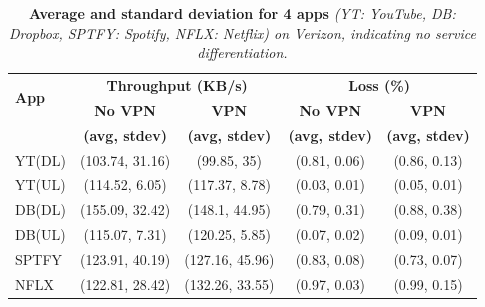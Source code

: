  \begin{table}
\centering
\begin{small}
\begin{tabular}{|p{}|c|c|c|c|}
\hline
\multirow{2}{*}{\bf App} & \multicolumn{2}{c|}{\bf Throughput (KB/s)} &  \multicolumn{2}{c|}{\bf Loss (\%)} \tabularnewline
\cline{2-5}
                              & {\bf No VPN}  & {\bf VPN} & {\bf No VPN} & {\bf VPN}   \tabularnewline
                              & {\bf (avg, stdev)}  & {\bf (avg, stdev)} & {\bf (avg, stdev)} & {\bf (avg, stdev)}   \tabularnewline
\hline

YT(DL) & (103.74, 31.16) & (99.85, 35) & (0.81, 0.06) & (0.86, 0.13) \tabularnewline
\hline
YT(UL) & (114.52, 6.05) & (117.37, 8.78) & (0.03, 0.01) & (0.05, 0.01) \tabularnewline
\hline
DB(DL)  & (155.09, 32.42) & (148.1, 44.95) & (0.79, 0.31) & (0.88, 0.38) \tabularnewline
\hline
DB(UL) & (115.07, 7.31) & (120.25, 5.85) & (0.07, 0.02) & (0.09, 0.01) \tabularnewline
\hline
SPTFY & (123.91, 40.19) & (127.16, 45.96) & (0.83, 0.08) & (0.73, 0.07) \tabularnewline
\hline
NFLX & (122.81, 28.42) & (132.26, 33.55) & (0.97, 0.03) & (0.99, 0.15) \tabularnewline
\hline
\end{tabular}
\end{small}
\caption{ \textbf{Average and standard deviation for 4  apps } \emph{(YT: YouTube, DB: Dropbox, SPTFY: Spotify, NFLX: Netflix) on 
Verizon, indicating no service differentiation. }}
\label{tab:svcdiff}
\vspace{\postfigspace}
\end{table}

%


